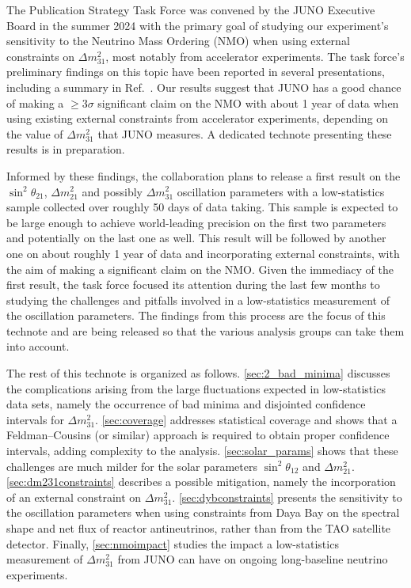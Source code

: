
The Publication Strategy Task Force was convened by the JUNO Executive Board in the summer 2024 with the primary goal of studying our experiment's sensitivity to the Neutrino Mass Ordering (NMO) when using external constraints on $\Delta m^2_{31}$, most notably from accelerator experiments. The task force's preliminary findings on this topic have been reported in several presentations, including a summary in Ref.~\cite{docdb:jantfreport}. Our results suggest that JUNO has a good chance of making a $\geq 3\sigma$ significant claim on the NMO with about 1 year of data when using existing external constraints from accelerator experiments, depending on the value of $\Delta m^2_{31}$ that JUNO measures. A dedicated technote presenting these results is in preparation. 

Informed by these findings, the collaboration plans to release a first result on the $\sin^2 \theta_{21}$, $\Delta m^2_{21}$ and possibly $\Delta m^2_{31}$ oscillation parameters with a low-statistics sample collected over roughly 50 days of data taking. This sample is expected to be large enough to achieve world-leading precision on the first two parameters and potentially on the last one as well. This result will be followed by another one on about roughly 1 year of data and incorporating external constraints, with the aim of making a significant claim on the NMO. Given the immediacy of the first result, the task force focused its attention during the last few months to studying the challenges and pitfalls involved in a low-statistics measurement of the oscillation parameters. The findings from this process are the focus of this technote and are being released so that the various analysis groups can take them into account.

The rest of this technote is organized as follows. \autoref{sec:2_bad_minima} discusses the complications arising from the large fluctuations expected in low-statistics data sets, namely the occurrence of bad minima and disjointed confidence intervals for $\Delta m^2_{31}$. \autoref{sec:coverage} addresses statistical coverage and shows that a Feldman–Cousins (or similar) approach is required to obtain proper confidence intervals, adding complexity to the analysis. \autoref{sec:solar_params} shows that these challenges are much milder for the solar parameters $\sin^2\theta_{12}$ and $\Delta m^2_{21}$.  \autoref{sec:dm231constraints} describes a possible mitigation, namely the incorporation of an external constraint on $\Delta m^2_{31}$. \autoref{sec:dybconstraints} presents the sensitivity to the oscillation parameters when using constraints from Daya Bay on the spectral shape and net flux of reactor antineutrinos, rather than from the TAO satellite detector. Finally, \autoref{sec:nmoimpact} studies the impact a low-statistics measurement of $\Delta m^2_{31}$ from JUNO can have on ongoing long-baseline neutrino experiments. 

